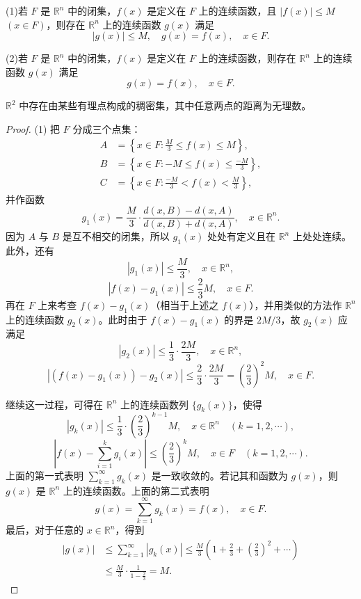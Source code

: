 \documentclass[../../main.tex]{subfiles}%
\begin{document}
\begin{theorem}[连续延拓定理]\label{theorem:连续函数延拓定理}
(1)若 \(F\) 是 \(\mathbb{R}^n\) 中的闭集，\(f(x)\) 是定义在 \(F\) 上的连续函数，且 \(|f(x)|\leqslant M\) \((x\in F)\)，则存在 \(\mathbb{R}^n\) 上的连续函数 \(g(x)\) 满足
\[
|g(x)|\leqslant M, \quad g(x)=f(x), \quad x\in F.
\]

(2)若 \(F\) 是 \(\mathbb{R}^n\) 中的闭集，\(f(x)\) 是定义在 \(F\) 上的连续函数，则存在 \(\mathbb{R}^n\) 上的连续函数 \(g(x)\) 满足
\[
g(x)=f(x), \quad x\in F.
\]
\end{theorem}
\begin{remark}
\(\mathbb{R}^2\) 中存在由某些有理点构成的稠密集，其中任意两点的距离为无理数。 
\end{remark}
\begin{proof}
(1) 把 \(F\) 分成三个点集：
\begin{align*}
A&=\left\{x\in F:\frac{M}{3}\leqslant f(x)\leqslant M\right\},\\
B&=\left\{x\in F:-M\leqslant f(x)\leqslant\frac{-M}{3}\right\},\\
C&=\left\{x\in F:\frac{-M}{3}<f(x)<\frac{M}{3}\right\},
\end{align*}
并作函数
\[
g_1(x)=\frac{M}{3}\cdot\frac{d(x,B)-d(x,A)}{d(x,B)+d(x,A)}, \quad x\in\mathbb{R}^n.
\]
因为 \(A\) 与 \(B\) 是互不相交的闭集，所以 \(g_1(x)\) 处处有定义且在 \(\mathbb{R}^n\) 上处处连续。此外，还有
\[
|g_1(x)|\leqslant\frac{M}{3}, \quad x\in\mathbb{R}^n,
\]
\[
|f(x)-g_1(x)|\leqslant\frac{2}{3}M, \quad x\in F.
\]
再在 \(F\) 上来考查 \(f(x)-g_1(x)\)（相当于上述之 \(f(x)\)），并用类似的方法作 \(\mathbb{R}^n\) 上的连续函数 \(g_2(x)\)。此时由于 \(f(x)-g_1(x)\) 的界是 \(2M/3\)，故 \(g_2(x)\) 应满足
\[
|g_2(x)|\leqslant\frac{1}{3}\cdot\frac{2M}{3}, \quad x\in\mathbb{R}^n,
\]
\[
|(f(x)-g_1(x))-g_2(x)|\leqslant\frac{2}{3}\cdot\frac{2M}{3}=\left(\frac{2}{3}\right)^2M, \quad x\in F.
\]

继续这一过程，可得在 \(\mathbb{R}^n\) 上的连续函数列 \(\{g_k(x)\}\)，使得
\[
|g_k(x)|\leqslant\frac{1}{3}\cdot\left(\frac{2}{3}\right)^{k - 1}M, \quad x\in\mathbb{R}^n \quad (k = 1,2,\cdots),
\]
\[
\left|f(x)-\sum_{i = 1}^{k}g_i(x)\right|\leqslant\left(\frac{2}{3}\right)^kM, \quad x\in F \quad (k = 1,2,\cdots).
\]
上面的第一式表明 \(\sum_{k = 1}^{\infty}g_k(x)\) 是一致收敛的。若记其和函数为 \(g(x)\)，则 \(g(x)\) 是 \(\mathbb{R}^n\) 上的连续函数。上面的第二式表明
\[
g(x)=\sum_{k = 1}^{\infty}g_k(x)=f(x), \quad x\in F.
\]
最后，对于任意的 \(x\in\mathbb{R}^n\)，得到
\begin{align*}
|g(x)|&\leqslant\sum_{k = 1}^{\infty}|g_k(x)|\leqslant\frac{M}{3}\left(1+\frac{2}{3}+\left(\frac{2}{3}\right)^2+\cdots\right)\\
&\leqslant\frac{M}{3}\cdot\frac{1}{1 - \frac{2}{3}}=M.
\end{align*}


\end{proof}
\end{document}
